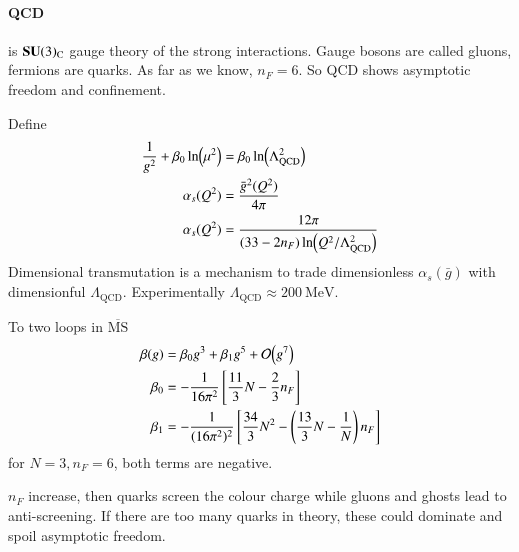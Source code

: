 \paragraph{QCD} is $\mathbf{SU}(3)_\text{C}$ gauge theory of the strong interactions. Gauge bosons are called gluons, fermions are quarks. As far as we know, $n_F = 6$. So QCD shows asymptotic freedom and confinement.

Define 
\begin{align}
   \frac{1}{g^2} + \beta_0 \ln(\mu^2) &= \beta_0 \ln(\Lambda_\text{QCD}^2) \notag \\
   \alpha_s(Q^2) &= \frac{\bar{g}^2 (Q^2)}{4\pi} \notag \\
   \alpha_s (Q^2) &= \frac{12 \pi}{(33 - 2 n_F) \ln (Q^2 / \Lambda_\text{QCD}^2 )}
\end{align}
Dimensional transmutation is a mechanism to trade dimensionless $\alpha_s (\bar{g})$ with dimensionful $\Lambda_\text{QCD}$. Experimentally $\Lambda_\text{QCD} \approx \SI{200}{\mega \eV}$.

To two loops in $\overline{\text{MS}}$
\begin{align}
   \beta (g) &= \beta_0 g^3 + \beta_1 g^5 + \order{g^7} \\
   \beta_0 &= - \frac{1}{16\pi^2} \left[ \frac{11}{3} N - \frac{2}{3} n_F \right] \\
   \beta_1 &= - \frac{1}{(16\pi^2)^2} \left[ \frac{34}{3} N^2 - \left( \frac{13}{3} N - \frac{1}{N} \right) n_F\right]
\end{align}
for $N=3, n_F=6$, both terms are negative.

$n_F$ increase, then quarks screen the colour charge while gluons and ghosts lead to anti-screening. If there are too many quarks in theory, these could dominate and spoil asymptotic freedom.
